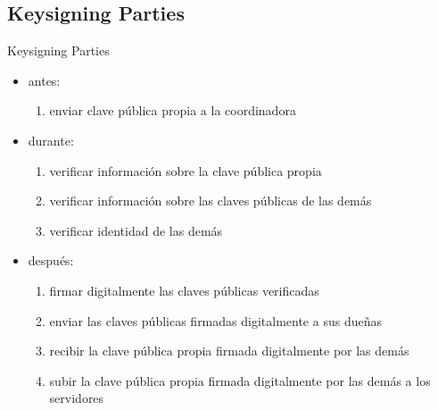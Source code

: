 \documentclass{beamer}
\begin{document}
\subsection{Keysigning Parties}
\begin{frame}{Keysigning Parties}
\begin{itemize}
    \item antes:
        \begin{enumerate}
            \item enviar clave pública propia a la coordinadora
        \end{enumerate}
    \item durante:
        \begin{enumerate}
            \item verificar información sobre la clave pública propia
            \item verificar información sobre las claves públicas de las demás
            \item verificar identidad de las demás
        \end{enumerate}
    \item después:
        \begin{enumerate}
            \item firmar digitalmente las claves públicas verificadas
            \item enviar las claves públicas firmadas digitalmente a sus dueñas
            \item recibir la clave pública propia firmada digitalmente por las demás
            \item subir la clave pública propia firmada digitalmente por las
                demás a los servidores
        \end{enumerate}
\end{itemize}
\end{frame}
\end{document}
